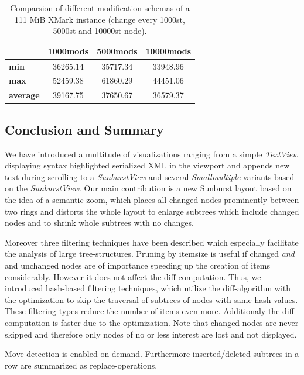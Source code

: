 \begin{table}[tb]
\centering 
\begin{tabular}[r]{|l|c|c|c|} 
\hline
& \textbf{1000mods} & \textbf{5000mods} & \textbf{10000mods}\\
\hline
\hline
\textbf{min} & 36265.14 & 35717.34 & 33948.96\\
\hline
\textbf{max} & 52459.38 & 61860.29 & 44451.06\\
\hline
\textbf{average} & 39167.75 & 37650.67 & 36579.37\\
\hline
\end{tabular}
\label{chap3:comparsion}
\vspace{0.5em} 
\caption{Comparsion of different modification-schemas of a 111 MiB XMark instance (change every 1000st, 5000st and 10000st node).}
\end{table}

\subsection{Conclusion and Summary}
We have introduced a multitude of visualizations ranging from a simple \emph{TextView} displaying syntax highlighted serialized XML in the viewport and appends new text during scrolling to a \emph{SunburstView} and several \emph{Smallmultiple} variants based on the \emph{SunburstView}. Our main contribution is a new Sunburst layout based on the idea of a semantic zoom, which places all changed nodes prominently between two rings and distorts the whole layout to enlarge subtrees which include changed nodes and to shrink whole subtrees with no changes. 

Moreover three filtering techniques have been described which especially facilitate the analysis of large tree-structures. Pruning by itemsize is useful if changed \emph{and} and unchanged nodes are of importance speeding up the creation of items considerably. However it does not affect the diff-computation. Thus, we introduced hash-based filtering techniques, which utilize the diff-algorithm with the optimization to skip the traversal of subtrees of nodes with same hash-values. These filtering types reduce the number of items even more. Additionaly the diff-computation is faster due to the optimization. Note that changed nodes are never skipped and therefore only nodes of no or less interest are lost and not displayed.

Move-detection is enabled on demand. Furthermore inserted/deleted subtrees in a row are summarized as replace-operations.

